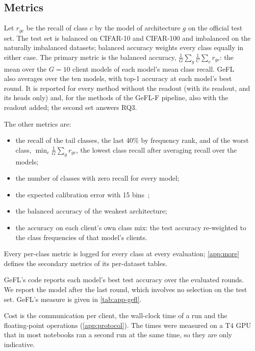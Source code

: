 \subsection{Metrics}\label{sec:setup-metrics}

Let $r_{gc}$ be the recall of class $c$ by the model of architecture $g$ on the official test set. The test set is
balanced on CIFAR-10 and CIFAR-100 and imbalanced on the naturally imbalanced
datasets; balanced accuracy weights every class equally in either case. The primary metric is the balanced accuracy, $\frac1G\sum_g\frac1C\sum_c r_{gc}$: the mean
over the $G=10$ client models of each model's mean class recall. GeFL~\cite{kang2025gefl} also averages over the
ten models, with top-1 accuracy at each model's best round. It is reported for every method without the readout (\ours with its readout, and its heads only)
and, for the methods of the GeFL-F pipeline, also with the readout added; the second set answers RQ3.

The other metrics are:
\begin{itemize}
\item the recall of the tail classes, the last 40\% by frequency rank, and of the worst class,
$\min_c\frac1G\sum_g r_{gc}$, the lowest class recall after averaging recall over the models;
\item the number of classes with zero recall for every model;
\item the expected calibration error with 15 bins~\cite{guo2017calibration};
\item the balanced accuracy of the weakest architecture;
\item the accuracy on each client's own class mix: the test accuracy re-weighted to the class frequencies of that
model's clients.
\end{itemize}
Every per-class metric is logged for every class at every evaluation; \cref{app:more} defines the secondary
metrics of its per-dataset tables.

GeFL's code reports each model's best test accuracy over the evaluated rounds. We report the model after the last
round, which involves no selection on the test set. GeFL's measure is given in \cref{tab:app-gefl}.

Cost is the communication per client, the wall-clock time of a run and the floating-point operations
(\cref{app:protocol}). The times were measured on a T4 GPU that in most notebooks ran a second run at the same time,
so they are only indicative.

